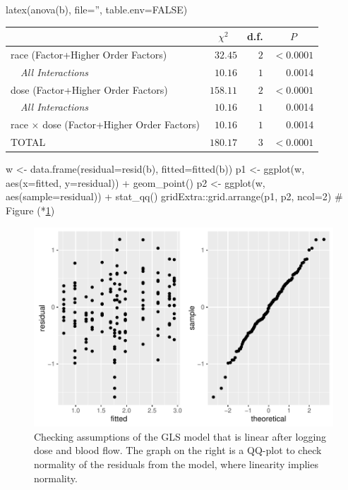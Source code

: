 \begin{Sinput}
latex(anova(b), file='', table.env=FALSE)
\end{Sinput}
\begin{center}
\begin{tabular}{lrrr}
\hline\hline
\multicolumn{1}{l}{}&\multicolumn{1}{c}{$\chi^2$}&\multicolumn{1}{c}{d.f.}&\multicolumn{1}{c}{$P$}\tabularnewline
\hline
race  (Factor+Higher Order Factors)&$ 32.45$&$2$&$<0.0001$\tabularnewline
~~{\it All Interactions}&$ 10.16$&$1$&~0.0014\tabularnewline
dose  (Factor+Higher Order Factors)&$158.11$&$2$&$<0.0001$\tabularnewline
~~{\it All Interactions}&$ 10.16$&$1$&~0.0014\tabularnewline
race $\times$ dose  (Factor+Higher Order Factors)&$ 10.16$&$1$&~0.0014\tabularnewline
TOTAL&$180.17$&$3$&$<0.0001$\tabularnewline
\hline
\end{tabular}\end{center}
\begin{Sinput}
w <- data.frame(residual=resid(b), fitted=fitted(b))
p1 <- ggplot(w, aes(x=fitted, y=residual)) + geom_point()
p2 <- ggplot(w, aes(sample=residual)) + stat_qq()
gridExtra::grid.arrange(p1, p2, ncol=2)   # Figure (*\ref{fig:serial-glsc}\ipacue*)
\end{Sinput}
\begin{figure}[htbp]

\centerline{\includegraphics{serial-glsc-1} }

\caption[Checking assumptions of GLS model]{Checking assumptions of the GLS model that is linear after logging dose and blood flow.  The graph on the right is a QQ-plot to check normality of the residuals from the model, where linearity implies normality.}\label{fig:serial-glsc}
\end{figure}

